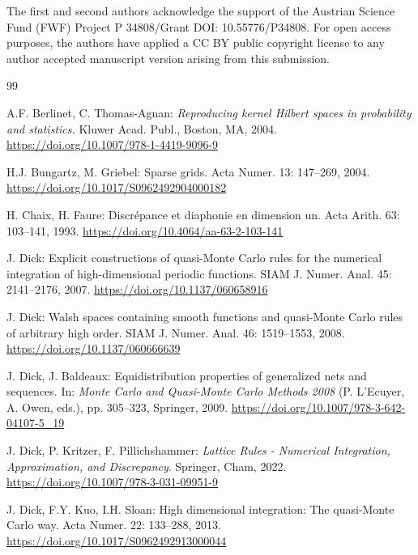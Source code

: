 \documentclass[12pt, a4paper]{article}
\begin{document}
The first and second authors acknowledge the support of the Austrian Science Fund (FWF) Project  P 34808/Grant DOI: 10.55776/P34808. For open access purposes, the authors have applied a CC BY public copyright license to any author accepted manuscript version arising from this submission.

\begin{thebibliography}{99}

 A.F. Berlinet, C. Thomas-Agnan: {\it Reproducing kernel Hilbert spaces in probability and statistics.} Kluwer Acad. Publ., Boston, MA, 2004. \href{https://doi.org/10.1007/978-1-4419-9096-9}{https://doi.org/10.1007/978-1-4419-9096-9}

 H.J. Bungartz, M. Griebel: Sparse grids. Acta Numer. 13: 147--269, 2004. \href{https://doi.org/10.1017/S0962492904000182}{https://doi.org/10.1017/S0962492904000182}

 H. Chaix, H. Faure: Discr\'{e}pance et diaphonie en dimension un. Acta Arith. 63: 103--141, 1993. \href{https://doi.org/10.4064/aa-63-2-103-141}{https://doi.org/10.4064/aa-63-2-103-141}

 J. Dick: Explicit constructions of quasi-Monte Carlo rules for the numerical integration of high-dimensional periodic functions. SIAM J. Numer. Anal. 45: 2141--2176, 2007. \href{https://doi.org/10.1137/060658916}{https://doi.org/10.1137/060658916}

 J. Dick: Walsh spaces containing smooth functions and quasi-Monte Carlo rules of arbitrary high order. SIAM J. Numer. Anal. 46: 1519--1553, 2008. \href{https://doi.org/10.1137/060666639}{https://doi.org/10.1137/060666639}

 J. Dick, J. Baldeaux: Equidistribution properties of generalized nets and sequences. In: {\it Monte Carlo and Quasi-Monte Carlo Methods 2008} (P. L'Ecuyer, A. Owen, eds.), pp. 305--323, Springer, 2009. \href{https://doi.org/10.1007/978-3-642-04107-5_19}{https://doi.org/10.1007/978-3-642-04107-5\_19}

 J. Dick, P. Kritzer, F. Pillichshammer: {\it Lattice Rules - Numerical Integration, Approximation, and Discrepancy}. Springer, Cham, 2022. \href{https://doi.org/10.1007/978-3-031-09951-9}{https://doi.org/10.1007/978-3-031-09951-9}

 J. Dick, F.Y. Kuo, I.H. Sloan: High dimensional integration: The quasi-Monte Carlo way. Acta Numer. 22: 133--288, 2013. \href{https://doi.org/10.1017/S0962492913000044}{https://doi.org/10.1017/S0962492913000044}


\end{thebibliography}
\end{document}
